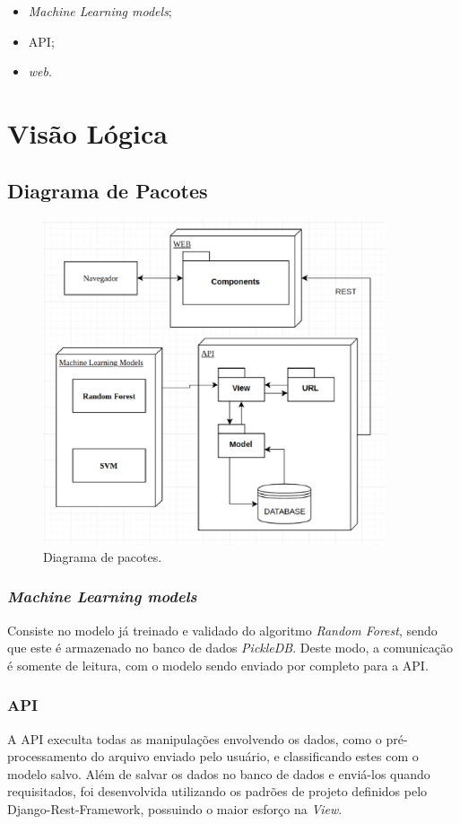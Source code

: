 \begin{apendicesenv}
    \begin{itemize}
        \item \textit{Machine Learning models};
        \item API;
        \item \textit{web}.
    \end{itemize}


   \section{Visão Lógica}
   \subsection{Diagrama de Pacotes}
   \begin{figure}[!htb]
        \centering
        \includegraphics[width=0.9\textwidth]{figuras/diagrama_pacotes.eps}
        \caption{Diagrama de pacotes.}
        \label{diagramadepacotes}
    \end{figure}
    \subsubsection{\textit{Machine Learning models}}
    Consiste no modelo já treinado e validado do algoritmo \textit{Random Forest}, sendo que este é armazenado no banco de dados \textit{PickleDB}. Deste modo, a comunicação é somente de leitura, com o modelo sendo enviado por completo para a API.
    \subsubsection{API}
    A API execulta todas as manipulações envolvendo os dados, como o pré-processamento do arquivo enviado pelo usuário, e classificando estes com o modelo salvo. Além de salvar os dados no banco de dados e enviá-los quando requisitados, foi desenvolvida utilizando os padrões de projeto definidos pelo Django-Rest-Framework, possuindo o maior esforço na \textit{View}.


\end{apendicesenv}
